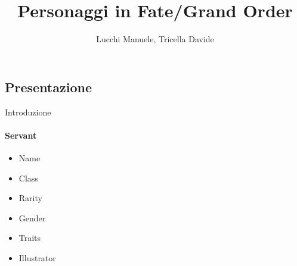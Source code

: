 \documentclass{beamer}
\title{Personaggi in Fate/Grand Order} %
\author{Lucchi Manuele, Tricella Davide}
\begin{document}
\frame[c]{\maketitle}

\begin{darkframes}

  \section{Presentazione}

  \begin{frame}{Introduzione}
    \framesubtitle{Servant}
    \begin{varwidth}{\textwidth}
      \begin{itemize}
        \item Name
        \item Class
        \item Rarity
        \item Gender
        \item Traits
        \item Illustrator
      \end{itemize}
    \end{varwidth}
    \hfil
    \begin{varwidth}{\textwidth}
      \hspace{2.5cm}

\end{varwidth}
\end{frame}
\end{darkframes}
\end{document}
